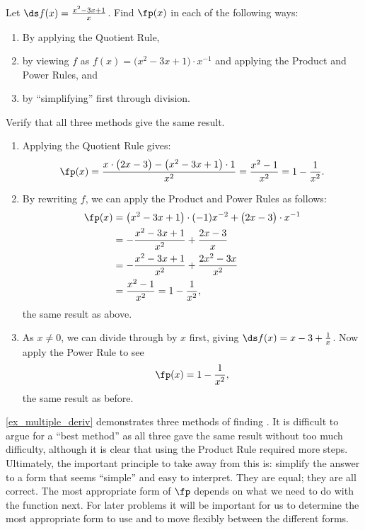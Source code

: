 \begin{example}\label{ex_multiple_deriv}
Let $\ds f(x) = \frac{x^2-3x+1}{x}$. Find $\fp(x)$ in each of the following ways:
\begin{enumerate}
	\item	By applying the Quotient Rule,
	\item	by viewing $f$ as $f(x) = \bigl(x^2-3x+1\bigr)\cdot x^{-1}$ and applying the Product and Power Rules, and
	\item	by ``simplifying\primeskip'' first through division.
\end{enumerate}
Verify that all three methods give the same result.
\solution
\begin{enumerate}
	\item	Applying the Quotient Rule gives:
	\[\fp(x) = \frac{x\cdot\bigl(2x-3\bigr)-\bigl(x^2-3x+1\bigr)\cdot 1}{x^2} = \frac{x^2-1}{x^2} = 1-\frac{1}{x^2}.\]
	\item	By rewriting $f$, we can apply the Product and Power Rules as follows:
	\begin{align*}
		\fp(x)
		&= \bigl(x^2-3x+1\bigr)\cdot (-1)x^{-2} + \bigl(2x-3\bigr)\cdot x^{-1} \\
		&= -\frac{x^2-3x+1}{x^2}+\frac{2x-3}{x} \\
		&= -\frac{x^2-3x+1}{x^2}+\frac{2x^2-3x}{x^2}\\
		&= \frac{x^2-1}{x^2} = 1-\frac{1}{x^2},
	\end{align*}
	the same result as above.
	\item	As $x\neq 0$, we can divide through by $x$ first, giving $\ds f(x) = x-3+\frac{1}x$. Now apply the Power Rule to see
	\[\fp(x) = 1-\frac{1}{x^2},\]
	the same result as before.
\end{enumerate}
\end{example}

\autoref{ex_multiple_deriv} demonstrates three methods of finding \fp. It is difficult to argue for a ``best method'' as all three gave the same result without too much difficulty, although it is clear that using the Product Rule required more steps. Ultimately, the important principle to take away from this is: simplify the answer to a form that seems ``simple'' and easy to interpret.  They are equal; they are all correct. The most appropriate form of $\fp$ depends on what we need to do with the function next. For later problems it will be important for us to determine the most appropriate form to use and to move flexibly between the different forms.
		
